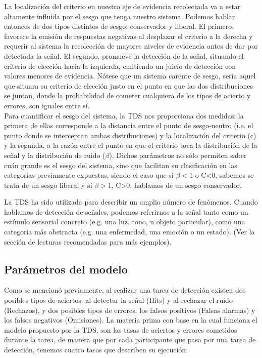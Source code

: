 \begin{itemize}
\begin{itemize}
La localización del criterio en nuestro eje de evidencia recolectada va a estar altamente influida por el sesgo que tenga nuestro sistema. Podemos hablar entonces de dos tipos distintos de sesgo: conservador y liberal. El primero, favorece la emisión de respuestas negativas al desplazar el criterio a la derecha y requerir al sistema la recolección de mayores niveles de evidencia antes de dar por detectada la señal. El segundo, promueve la detección de la señal, situando el criterio de elección hacia la izquierda, emitiendo un juicio de detección con valores menores de evidencia. Nótese que un sistema carente de sesgo, sería aquel que situara su criterio de elección justo en el punto en que las dos distribuciones se juntan, donde la probabilidad de cometer cualquiera de los tipos de acierto y errores, son iguales entre sí.\\

Para cuantificar el sesgo del sistema, la TDS nos proporciona dos medidas: la primera de ellas corresponde a la distancia entre el punto de sesgo-neutro (i.e. el punto donde se interceptan ambas distribuciones) y la localización del criterio (c) y la segunda, a la razón entre el punto en que el criterio toca la distribución de la señal y la distribución de ruido ($\beta$). Dichos parámetros no sólo permiten saber cuán grande es el sesgo del sistema, sino que facilitan su clasificación en las categorías previamente expuestas, siendo el caso que si $\beta<1$ o C<0, sabemos se trata de un sesgo liberal y si $\beta>1$, C>0, hablamos de un sesgo conservador.\\
     \end{itemize}
\end{itemize}



La TDS ha sido utilizada para describir un amplio número de fenómenos. Cuando hablamos de detección de señales, podemos referirnos a la señal tanto como un estímulo sensorial concreto (e.g. una luz, tono, u objeto particular), como una categoría más abstracta (e.g. una enfermedad, una emoción o un estado).  (Ver la sección de lecturas recomendadas para más ejemplos).\\


\subsection{Parámetros del modelo}

Como se mencionó previamente, al realizar una tarea de detección existen dos posibles tipos de aciertos: al detectar la señal (Hits) y al rechazar el ruido (Rechazos), y dos posibles tipos de errores: los falsos positivos (Falsas alarmas) y los falsos negativos (Omisiones). La materia prima con base en la cual funciona el modelo propuesto por la TDS, son las tasas de aciertos y errores cometidos durante la tarea, de manera que por cada participante que pasa por una tarea de detección, tenemos cuatro tasas que describen su ejecución:

